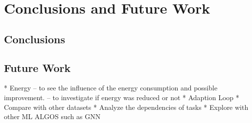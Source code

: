

\chapter{Conclusions and Future Work}
\label{ch:conclusions-and-future-work}

    \section{Conclusions}
    \label{sec:conclusions}

    \section{Future Work}
    \label{sec:future-work}

    * Energy 
    -- to see the influence of the energy consumption and possible improvement.
    -- to investigate if energy was reduced or not
    * Adaption Loop
    * Compare with other datasets
    * Analyze the dependencies of tasks
    * Explore with other ML ALGOS such as GNN